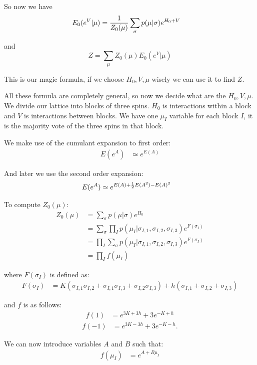 \documentclass[11pt]{article}
\begin{document}
So now we have
\begin{align*}
E_{0}(e^{V} | \mu) &= {{1} \over {Z_{0}(\mu)}}\sum_{\sigma} p(\mu | \sigma)e^{H_{0}+V}
\end{align*}

and
$$\boxed{Z = \sum_{\mu} Z_{0}(\mu)E_{0}(e^{V} | \mu)}$$

This is our magic formula, if we choose
$H_0, V, \mu$ wisely we can use it to find $Z$.

All these formula are completely general, so
now we decide what are the $H_0, V, \mu$.
We divide our lattice into blocks of three spins.
$H_0$ is interactions within a block and $V$ is
interactions between blocks.
We have one $\mu_I$ variable for each block $I$,
it is the majority vote of the three spins %
in that block.

We make use of the cumulant expansion to first order:
\begin{align*}
E(e^{A}) &\simeq e^{E(A)}
\end{align*}

And later we use the second order expansion:
\begin{align*}
E(e^{A}) &\simeq e^{E(A)+{{1} \over {2}}E(A^{2})-E(A)^{2}}
\end{align*}

To compute $Z_0(\mu)$:
\begin{align*}
Z_{0}(\mu) &= \sum_{\sigma} p(\mu | \sigma)e^{H_{0}}\\
 &= \sum_{\sigma} \prod_{I} p(\mu_{I} | \sigma_{I,1}, \sigma_{I,2}, \sigma_{I,3})e^{F(\sigma_{I})}\\
 &= \prod_{I} \sum_{\sigma} p(\mu_{I} | \sigma_{I,1}, \sigma_{I,2}, \sigma_{I,3})e^{F(\sigma_{I})}\\
 &= \prod_{I} f(\mu_{I})
\end{align*}

where $F(\sigma_I)$ is defined as:
\begin{align*}
F(\sigma_{I}) &= K(\sigma_{I,1}\sigma_{I,2}+\sigma_{I,1}\sigma_{I,3}+\sigma_{I,2}\sigma_{I,3})+h(\sigma_{I,1}+\sigma_{I,2}+\sigma_{I,3})
\end{align*}

and $f$ is as follows:
\begin{align*}
f(1) &= e^{3K+3h}+3e^{-K+h}
\end{align*}
\begin{align*}
f(-1) &= e^{3K-3h}+3e^{-K-h}.
\end{align*}

We can now introduce variables $A$ and $B$ such that:
\begin{align*}
f(\mu_{I}) &= e^{A+B\mu_{I}}
\end{align*}
\end{document}
